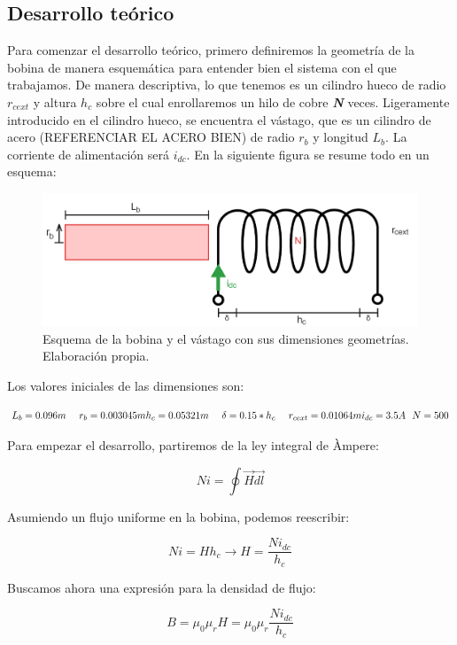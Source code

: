 \subsection{Desarrollo teórico}
Para comenzar el desarrollo teórico, primero definiremos la geometría de la bobina de manera esquemática para entender bien el sistema con el que trabajamos. De manera descriptiva, lo que tenemos es un cilindro hueco de radio \( r_{cext} \) y altura \( h_c \) sobre el cual enrollaremos un hilo de cobre \textbf{\textit{N}} veces. Ligeramente introducido en el cilindro hueco, se encuentra el vástago, que es un cilindro de acero (REFERENCIAR EL ACERO BIEN) de radio \( r_b \) y longitud \( L_b \). La corriente de alimentación será \( i_{dc} \). En la siguiente figura se resume todo en un esquema:

\begin{figure}[h]
    \centering
    \includegraphics[width=\linewidth]{FigurasMemoria/fig1esquemaGeom.png}
    \caption{Esquema de la bobina y el vástago con sus dimensiones geometrías. Elaboración propia.}
    \label{fig:1} %
\end{figure}

Los valores iniciales de las dimensiones son:

$$
L_b=0.096m~~~~r_b=0.003045m
\\~\\
h_c=0.05321m~~~~\delta=0.15*h_c~~~~r_{cext}=0.01064m
\\~\\
i_{dc}=3.5A~~N=500
$$

Para empezar el desarrollo, partiremos de la ley integral de Àmpere:

$$
Ni=\oint{\vec{H}\vec{dl}}
$$

Asumiendo un flujo uniforme en la bobina, podemos reescribir:

$$
Ni=Hh_c\to H=\frac{Ni_{dc}}{h_c}
$$

Buscamos ahora una expresión para la densidad de flujo:

$$
B=\mu_0\mu_rH=\mu_0\mu_r\frac{Ni_{dc}}{h_c}
$$

